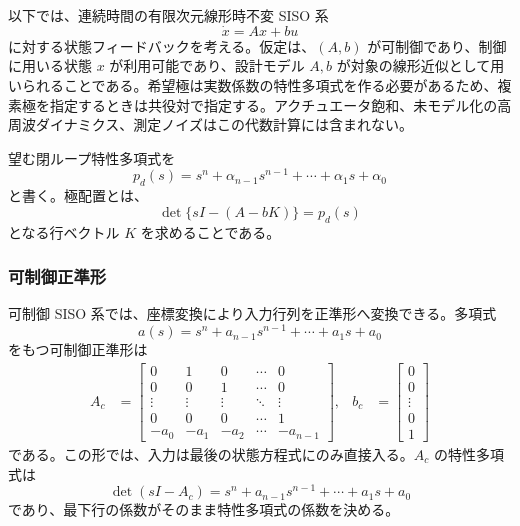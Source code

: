 以下では、連続時間の有限次元線形時不変 SISO 系
\begin{equation}
  \dot{x}=Ax+bu
\end{equation}
に対する状態フィードバックを考える。仮定は、$(A,b)$ が可制御であり、制御に用いる状態 $x$ が利用可能であり、設計モデル $A,b$ が対象の線形近似として用いられることである。希望極は実数係数の特性多項式を作る必要があるため、複素極を指定するときは共役対で指定する。アクチュエータ飽和、未モデル化の高周波ダイナミクス、測定ノイズはこの代数計算には含まれない。

望む閉ループ特性多項式を
\begin{equation}
  p_d(s)=s^n+\alpha_{n-1}s^{n-1}+\cdots+\alpha_1s+\alpha_0
  \label{eq:desired-poly}
\end{equation}
と書く。極配置とは、
\begin{equation}
  \det\{sI-(A-bK)\}=p_d(s)
\end{equation}
となる行ベクトル $K$ を求めることである。

\subsubsection{可制御正準形}

可制御 SISO 系では、座標変換により入力行列を正準形へ変換できる。多項式
\begin{equation}
  a(s)=s^n+a_{n-1}s^{n-1}+\cdots+a_1s+a_0
\end{equation}
をもつ可制御正準形は
\begin{align}
  A_c&=\begin{bmatrix}
    0&1&0&\cdots&0\\
    0&0&1&\cdots&0\\
    \vdots&\vdots&\vdots&\ddots&\vdots\\
    0&0&0&\cdots&1\\
    -a_0&-a_1&-a_2&\cdots&-a_{n-1}
  \end{bmatrix},&
  b_c&=\begin{bmatrix}0\\0\\\vdots\\0\\1\end{bmatrix}
\end{align}
である。この形では、入力は最後の状態方程式にのみ直接入る。$A_c$ の特性多項式は
\begin{equation}
  \det(sI-A_c)=s^n+a_{n-1}s^{n-1}+\cdots+a_1s+a_0
\end{equation}
であり、最下行の係数がそのまま特性多項式の係数を決める。

